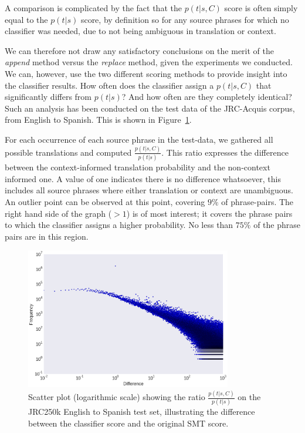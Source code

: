 \documentclass[smallextended]{svjour3}       %
\theoremstyle{break}
\begin{document}
A comparison is complicated by the fact that the $p(t|s,C)$ score is often simply
equal to the $p(t|s)$ score, by definition so for any source phrases for which no
classifier was needed, due to not being ambiguous in translation or context. 

We can therefore not draw any satisfactory conclusions on the merit of the
\emph{append} method versus the \emph{replace} method, given the experiments we
conducted. We can, however, use the two different scoring methods to provide
insight into the classifier results. How often does the classifier assign a
$p(t|s,C)$ that significantly differs from $p(t|s)$? And how often are they
completely identical?  Such an analysis has been conducted on the test data of
the JRC-Acquis corpus, from English to Spanish. This is shown in
Figure~\ref{fig:scoredifference}.

For each occurrence of each source phrase in the test-data, we gathered all
possible translations and computed $\frac{p(t|s,C)}{p(t|s)}$. This ratio
expresses the difference between the context-informed translation probability
and the non-context informed one. A value of one indicates there is no
difference whatsoever, this includes all source phrases where either
translation or context are unambiguous. An outlier point can
be observed at this point, covering $9\%$ of phrase-pairs. The right hand side
of the graph ($>1$) is of most interest; it covers the phrase pairs to which
the classifier assigns a higher probability. No less than $75\%$ of the phrase
pairs are in this region.

\begin{figure}
\begin{center}
\includegraphics[width=90.00mm]{scoredifference.png}
\caption{Scatter plot (logarithmic scale) showing the ratio
$\frac{p(t|s,C)}{p(t|s)}$ on the  JRC250k English to Spanish test set, illustrating the difference between the classifier score and the original SMT score.}
\label{fig:scoredifference}
\end{center}
\end{figure}
\end{document}
